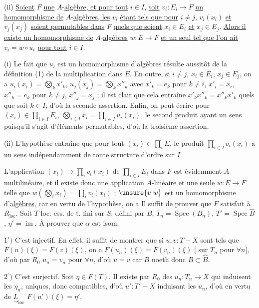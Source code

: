 (ii) \uline{Soient} $F$ \uline{une} $A$-\uline{algèbre, et pour tout} $i\in I$, \uline{soit} $v_i:E_i\to F$ \uline{un homomorphisme de} $A$-\uline{algèbres, les} $v_i$ \uline{étant tels que pour} $i\ne j$, $v_i(x_i)$ \uline{et} $v_j(x_j)$ \uline{soient permutables dans} $F$ \uline{quels que soient} $x_i\in E_i$ \uline{et} $x_j\in E_j$. \uline{Alors il existe un homomorphisme de} $A$-\uline{algèbres} $w:E\to F$ \uline{et un seul tel que l'on ait} $v_i=w\circ u_i$ \uline{pour tout} $i\in I$.

(i) Le fait que $u_i$ est un homomorphisme d'algèbres résulte aussitôt de la définition (1) de la multiplication dans $E$. En outre, si $i\ne j$, $x_i\in E_i$, $x_j\in E_j$, on a $u_i(x_i)=\bigotimes_k x'_k$, $u_j(x_j)=\bigotimes_k x''_k$ avec $x'_k=e_k$ pour $k\ne i$, $x'_i=x_i$, $x''_k=e_k$ pour $k\ne j$, $x''_j=x_j$ ; il est clair que cela entraîne $x'_kx''_k=x''_kx'_k$ quels que soit $k\in I$, d'où la seconde assertion. Enfin, on peut écrire pour $(x_i)\in\prod_{i\in I}E_i$, $\bigotimes_{i\in I}x_i=\prod_{i\in I}u_i(x_i)$, le second produit ayant un sens puisqu'il s'agit d'éléments permutables, d'où la troisième assertion.

(ii) L'hypothèse entraîne que pour tout $(x_i)\in\prod_i E_i$ le produit $\prod_{i\in I}v_i(x_i)$ a un sens indépendamment de toute structure d'ordre sur $I$.

L'application $(x_i)\to\prod_i v_i(x_i)$ de $\prod_{i\in I}E_i$ dans $F$ est évidemment $A$-multilinéaire, et il existe donc une application $A$-linéaire et une seule $w:E\to F$ telle que $w(\bigotimes_i x_i)=\prod_i v_i(x_i)$ ; $\unsure{v|w}$ est un homomorphisme d'\uline{algèbres}, car en vertu de l'hypothèse, on a
Il suffit de prouver que $F$ satisfait à $R_{\mathrm{loc}}$.
Soit $T$ loc. ess. de t. fini sur $S$, défini par $B$, $T_n=\operatorname{Spec}(B_n)$, $T'=\operatorname{Spec}\widehat B$, $\eta'=\operatorname{im}$.
À prouver que \textcircled{$\alpha$} est isom.

$1^\circ)$ C'est injectif. En effet, il suffit de montrer que si $u,v:T\mathbin{-}X$ sont tels que $F(u)(\xi)=F(v)(\xi)$, on a $F(u_n)(\xi)=F(v_n)(\xi)$ [ sur $T_n$ pour $\forall n$], d'où par $R_0$ $u_n=v_n$ pour $\forall n$, d'où $u=v$ car $B$ noeth donc $B\subset\widehat B$.

$2^\circ)$ C'est surjectif.  Soit $\eta\in F(T)$.
Il existe par $R_0$ des $u_n:T_n\to X$ qui induisent les $\eta_n$, uniques, donc compatibles, d'où  $u':T'\mathbin{-}X$  induisant les $u_n$, d'où  en vertu de $\underset{\rightarrow}{L}_{\mathrm{loc}}$  $F(u')(\xi)=\eta'$.

